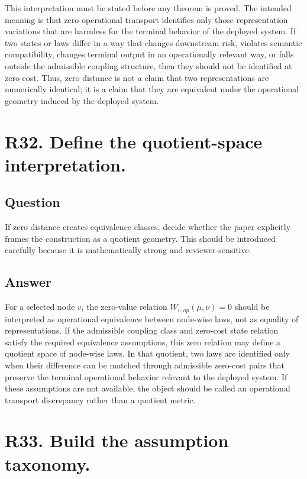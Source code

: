 \documentclass[11pt,a4paper]{article}
\begin{document}
This interpretation must be stated before any theorem is proved. The intended meaning is that zero operational transport identifies only those representation variations that are harmless for the terminal behavior of the deployed system. If two states or laws differ in a way that changes downstream risk, violates semantic compatibility, changes terminal output in an operationally relevant way, or falls outside the admissible coupling structure, then they should not be identified at zero cost. Thus, zero distance is not a claim that two representations are numerically identical; it is a claim that they are equivalent under the operational geometry induced by the deployed system.

\section*{R32. Define the quotient-space interpretation.}

\subsection*{Question}

If zero distance creates equivalence classes, decide whether the paper explicitly frames the construction as a quotient geometry. This should be introduced carefully because it is mathematically strong and reviewer-sensitive.

\subsection*{Answer}

For a selected node \(v\), the zero-value relation \(W_{v,op}(\mu,\nu)=0\) should be interpreted as operational equivalence between node-wise laws, not as equality of representations. If the admissible coupling class and zero-cost state relation satisfy the required equivalence assumptions, this zero relation may define a quotient space of node-wise laws. In that quotient, two laws are identified only when their difference can be matched through admissible zero-cost pairs that preserve the terminal operational behavior relevant to the deployed system. If these assumptions are not available, the object should be called an operational transport discrepancy rather than a quotient metric.

\section*{R33. Build the assumption taxonomy.}
\end{document}
